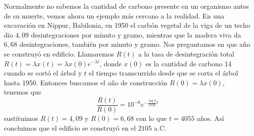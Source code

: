 \documentclass[../main.tex]{subfiles}
\begin{document}
Normalmente no sabemos la cantidad de carbono presente en un organismo antes de
su muerte, vemos ahora un ejemplo más cercano a la realidad. En una excavación
en Nippur, Babilonia, en 1950 el carbón vegetal de la viga de un techo dio 
\(4,09\) desintegraciones por minuto y gramo, mientras que la madera viva da 
\(6,68\) desintegraciones, también por minuto y gramo.  Nos preguntamos en que 
año se construyó en edificio.  Llamaremos \(R(t)\) a la tasa de desintegración
total
\(R(t) = \lambda x(t) = \lambda x(0) e^{-\lambda t}\), donde \(x(0)\) es la
cantidad de carbono 14 cuando se cortó el árbol y \(t\) el tiempo transcurrido
desde que se corta el árbol hasta 1950. Entonces buscamos el año de construcción
\(R(0) = \lambda x(0)\), tenemos que
\[\frac{R(t)}{R(0)} = 10^{-6} e^{-\frac{\log 2}{5730} t}\]
sustituimos \(R(t) = 4,09\) y \(R(0) = 6,68\) con lo que \(t = 4055\) años. Así
concluimos que el edificio se construyó en el \(2105\) a.C.
\end{document}
